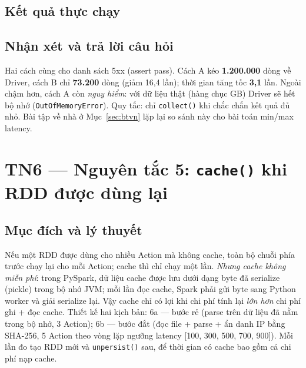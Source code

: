 \documentclass[12pt,a4paper,oneside]{article}
\begin{document}


\subsection{Kết quả thực chạy}



\subsection{Nhận xét và trả lời câu hỏi}

Hai cách cùng cho danh sách 5xx (assert pass). Cách A kéo \textbf{1.200.000} dòng về Driver, cách B chỉ \textbf{73.200} dòng (giảm 16,4 lần); thời gian tăng tốc \textbf{3,1} lần. Ngoài chậm hơn, cách A còn \emph{nguy hiểm}: với dữ liệu thật (hàng chục GB) Driver sẽ hết bộ nhớ (\texttt{OutOfMemoryError}). Quy tắc: chỉ \texttt{collect()} khi chắc chắn kết quả đủ nhỏ. Bài tập về nhà ở Mục~\ref{sec:btvn} lặp lại so sánh này cho bài toán min/max latency.

\section{TN6 --- Nguyên tắc 5: \texttt{cache()} khi RDD được dùng lại}
\label{sec:tn6}

\subsection{Mục đích và lý thuyết}

Nếu một RDD được dùng cho nhiều Action mà không cache, toàn bộ chuỗi phía trước chạy lại cho mỗi Action; cache thì chỉ chạy một lần. \emph{Nhưng cache không miễn phí}: trong PySpark, dữ liệu cache được lưu dưới dạng byte đã serialize (pickle) trong bộ nhớ JVM; mỗi lần đọc cache, Spark phải gửi byte sang Python worker và giải serialize lại. Vậy cache chỉ có lợi khi chi phí tính lại \emph{lớn hơn} chi phí ghi + đọc cache. Thiết kế hai kịch bản: 6a --- bước rẻ (parse trên dữ liệu đã nằm trong bộ nhớ, 3 Action); 6b --- bước đắt (đọc file + parse + ẩn danh IP bằng SHA-256, 5 Action theo vòng lặp ngưỡng latency [100, 300, 500, 700, 900]). Mỗi lần đo tạo RDD mới và \texttt{unpersist()} sau, để thời gian có cache bao gồm cả chi phí nạp cache.
\end{document}
